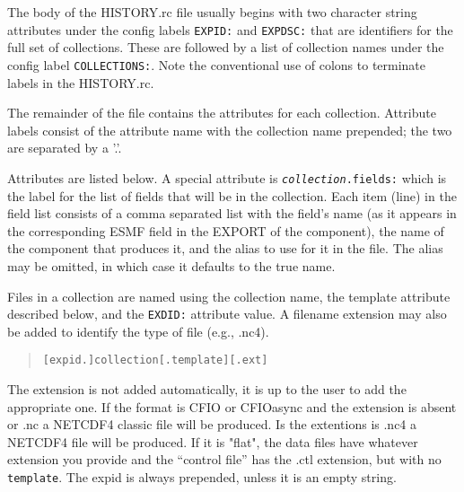 The body of the HISTORY.rc file usually begins with two
character string attributes under the config labels {\tt EXPID:} and {\tt EXPDSC:}
that are identifiers for the full set of collections. These are followed
by a list of collection names under the config label {\tt COLLECTIONS:}. Note
the conventional use of colons to terminate labels in the HISTORY.rc.

The remainder of the file contains the attributes for each collection.
Attribute labels consist of the attribute name with the collection name
prepended; the two are separated by a '.'.

Attributes are listed below. A special attribute is {\tt {\em collection}.fields:}
which is the label for the list of fields that will be in the collection.
Each item (line) in the field list consists of a comma separated list
with the field's name (as it appears in
the corresponding ESMF field in the EXPORT of the component), the name of the component that
produces it, and the alias to use for it in the file. The alias may be omitted, in which case
it defaults to the true name.

Files in a collection are named using the collection name, the
template attribute described below, and the {\tt EXDID:} attribute
value. A filename extension may also be added to identify the type of
file (e.g., .nc4).
\begin{quote}
    {\tt [expid.]collection[.template][.ext]}
\end{quote}
The extension is not added automatically, it is up to the user to add the appropriate one.
If the format is CFIO or CFIOasync and the extension is absent or .nc a NETCDF4 classic file
will be produced. Is the extentions is .nc4 a NETCDF4 file will be produced.
If it is "flat", the data files have whatever extension you provide and
the ``control file'' has the .ctl extension, but with no {\tt
template}. The expid is always prepended, unless it is an empty
string.

